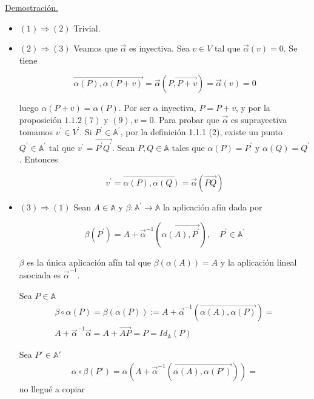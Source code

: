 \documentclass[12pt, a4paper, ones, notitlepage, openany,titlepage]{article}
\begin{document}
\underline{Demostración.} 
	\begin{itemize}
		\item$(1) \Rightarrow(2)$ Trivial.
		
		\item$(2) \Rightarrow(3)$ Veamos que $\vec{\alpha}$ es inyectiva. Sea $v \in V$ tal que $\vec{\alpha}(v)=0$. Se tiene
		
		$$
		\overrightarrow{\alpha(P), \alpha(P+v)}=\vec{\alpha}(\overrightarrow{P, P+v})=\vec{\alpha}(v)=0
		$$
		
		luego $\alpha(P+v)=\alpha(P)$. Por ser $\alpha$ inyectiva, $P=P+v$, y por la proposición $1.1 .2(7)$ y $(9), v=0$. Para probar que $\vec{\alpha}$ es suprayectiva tomamos $v^{\prime} \in V^{\prime}$. Si $P^{\prime} \in \mathbb{A}^{\prime}$, por la definición 1.1.1 (2), existe un punto $Q^{\prime} \in \mathbb{A}^{\prime}$ tal que $v^{\prime}=\overrightarrow{P^{\prime} Q^{\prime}}$. Sean $P, Q \in \mathbb{A}$ tales que $\alpha(P)=P^{\prime}$ y $\alpha(Q)=Q^{\prime}$. Entonces
		
		$$
		v^{\prime}=\overrightarrow{\alpha(P), \alpha(Q)}=\vec{\alpha}(\overrightarrow{P Q})
		$$
		
		\item$(3) \Rightarrow(1)$ Sean $A \in \mathbb{A}$ y $\beta: \mathbb{A}^{\prime} \rightarrow \mathbb{A}$ la aplicación afín dada por
		
		$$
		\beta\left(P^{\prime}\right)=A+\vec{\alpha}^{-1}\left(\overrightarrow{\alpha(A), P^{\prime}}\right), \quad P^{\prime} \in \mathbb{A}^{\prime}
		$$
		
		$\beta$ es la única aplicación afín tal que $\beta(\alpha(A))=A$ y la aplicación lineal asociada es $\vec{\alpha}^{-1}$.
		
		Sea $P\in\mathbb{A}$
		\begin{gather*}
			\beta\circ\alpha(P)=\beta(\alpha(P)):=A+\vec{\alpha}^{-1}(\overrightarrow{\alpha(A),\alpha(P)}) =\\ A+\vec{\alpha}^{-1}\vec{\alpha}=A+\overrightarrow{AP}=P=Id_{\mathbb{A}}(P)
		\end{gather*}
		
		Sea $P'\in\mathbb{A'}$
		\begin{gather*}
			\alpha\circ\beta(P')=\alpha(A+\vec{\alpha}^{-1}(\overrightarrow{\alpha(A),\alpha(P')})) = 
		\end{gather*} no llegué a copiar
	\end{itemize}
\end{document}
